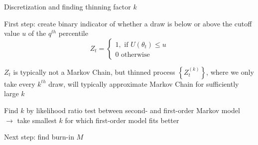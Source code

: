 \begin{frame}{Discretization and finding thinning factor $k$}
\begin{witemize}
    \item First step: create binary indicator of whether a draw is below or above the cutoff value $u$ of the $q^{th}$ percentile
    \begin{equation}
    Z_t = \left\{ {\begin{array}{*{20}{c}}
  {1, \text{ if } U(\theta_t)\leqslant u} \\
  {0 \text{ otherwise}}
\end{array}} \right.
\end{equation}
    \item $Z_t$ is typically not a Markov Chain, but thinned process $\left\{Z_t^{(k)}\right\}$, where we only take every $k^{th}$ draw, will typically approximate Markov Chain for sufficiently large $k$
    \item Find $k$ by likelihood ratio test between second- and first-order Markov model\\
    $\rightarrow$ take smallest $k$ for which first-order model fits better
    \item Next step: find burn-in $M$
\end{witemize}
\end{frame}

